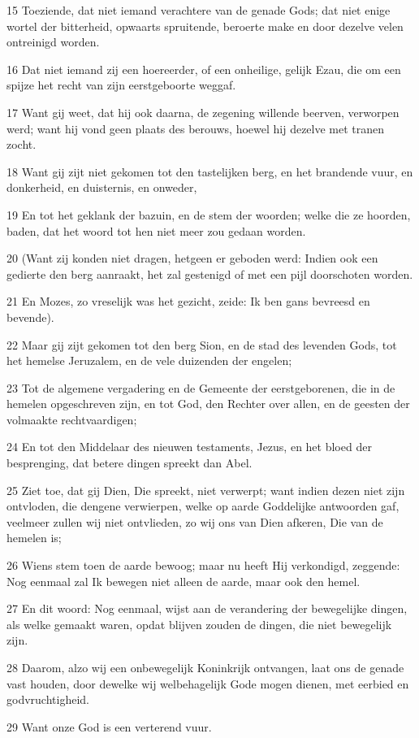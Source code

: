 \par 15 Toeziende, dat niet iemand verachtere van de genade Gods; dat niet enige wortel der bitterheid, opwaarts spruitende, beroerte make en door dezelve velen ontreinigd worden.
\par 16 Dat niet iemand zij een hoereerder, of een onheilige, gelijk Ezau, die om een spijze het recht van zijn eerstgeboorte weggaf.
\par 17 Want gij weet, dat hij ook daarna, de zegening willende beerven, verworpen werd; want hij vond geen plaats des berouws, hoewel hij dezelve met tranen zocht.
\par 18 Want gij zijt niet gekomen tot den tastelijken berg, en het brandende vuur, en donkerheid, en duisternis, en onweder,
\par 19 En tot het geklank der bazuin, en de stem der woorden; welke die ze hoorden, baden, dat het woord tot hen niet meer zou gedaan worden.
\par 20 (Want zij konden niet dragen, hetgeen er geboden werd: Indien ook een gedierte den berg aanraakt, het zal gestenigd of met een pijl doorschoten worden.
\par 21 En Mozes, zo vreselijk was het gezicht, zeide: Ik ben gans bevreesd en bevende).
\par 22 Maar gij zijt gekomen tot den berg Sion, en de stad des levenden Gods, tot het hemelse Jeruzalem, en de vele duizenden der engelen;
\par 23 Tot de algemene vergadering en de Gemeente der eerstgeborenen, die in de hemelen opgeschreven zijn, en tot God, den Rechter over allen, en de geesten der volmaakte rechtvaardigen;
\par 24 En tot den Middelaar des nieuwen testaments, Jezus, en het bloed der besprenging, dat betere dingen spreekt dan Abel.
\par 25 Ziet toe, dat gij Dien, Die spreekt, niet verwerpt; want indien dezen niet zijn ontvloden, die dengene verwierpen, welke op aarde Goddelijke antwoorden gaf, veelmeer zullen wij niet ontvlieden, zo wij ons van Dien afkeren, Die van de hemelen is;
\par 26 Wiens stem toen de aarde bewoog; maar nu heeft Hij verkondigd, zeggende: Nog eenmaal zal Ik bewegen niet alleen de aarde, maar ook den hemel.
\par 27 En dit woord: Nog eenmaal, wijst aan de verandering der bewegelijke dingen, als welke gemaakt waren, opdat blijven zouden de dingen, die niet bewegelijk zijn.
\par 28 Daarom, alzo wij een onbewegelijk Koninkrijk ontvangen, laat ons de genade vast houden, door dewelke wij welbehagelijk Gode mogen dienen, met eerbied en godvruchtigheid.
\par 29 Want onze God is een verterend vuur.

